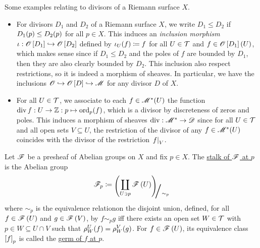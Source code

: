 \documentclass[../Moduli_Spaces_of_Riemann_Surfaces.tex]{subfiles}
\begin{document}
    \begin{example}
        Some examples relating to divisors of a Riemann surface $X$.
        \begin{itemize}
            \item For divisors $D_1$ and $D_2$ of a Riemann surface $X$, we write $D_1\leq D_2$ if $D_1\!\left(p\right)\leq D_2\!\left(p\right)$ for all $p\in X$. This induces an \textit{inclusion morphism} $\iota:\mathscr{O}\left[D_1\right]\hookrightarrow\mathscr{O}\left[D_2\right]$ defined by $\iota_U\!\left(f\right)\coloneqq f$ for all $U\in\mathcal{T}$ and $f\in\mathscr{O}\left[D_1\right]\left(U\right)$, which makes sense since if $D_1\leq D_2$ and the poles of $f$ are bounded by $D_1$, then they are also clearly bounded by $D_2$. This inclusion also respect restrictions, so it is indeed a morphism of sheaves. In particular, we have the inclusions $\mathscr{O}\hookrightarrow\mathscr{O}\left[D\right]\hookrightarrow\mathscr{M}$ for any divisor $D$ of $X$.
            \item For all $U\in\mathcal{T}$, we associate to each $f\in\mathscr{M}^\ast\!\left(U\right)$ the function $\operatorname{div} f:U\to\mathbb{Z}:p\mapsto\operatorname{ord}_p\!\left(f\right)$, which is a divisor by discreteness of zeros and poles. This induces a morphism of sheaves $\operatorname{div}:\mathscr{M}^\ast\to\mathscr{D}$ since for all $U\in\mathcal{T}$ and all open sets $V\subseteq U$, the restriction of the divisor of any $f\in\mathscr{M}^\ast\!\left(U\right)$ coincides with the divisor of the restriction $\left.f\right|_V$.\exqed
        \end{itemize}
    \end{example}
    \begin{definition}\label{CC:def:stalk}
        Let $\mathscr{F}$ be a presheaf of Abelian groups on $X$ and fix $p\in X$. The \ul{stalk of $\mathscr{F}$ at $p$} is the Abelian group
        \begin{equation*}
            \ms{F}_p\coloneqq\raisebox{-2pt}{$\Biggl(\!$}\coprod_{U\ni p}\ms{F}\l(U\r)\!\raisebox{-2pt}{$\Biggr)$}\!\!_{\scalebox{2}{/}\sim_p}
        \end{equation*}
        where $\sim_p$ is the equivalence relation\footnotemark on the disjoint union, defined, for all $f\in\mathscr{F}\left(U\right)$ and $g\in\mathscr{F}\left(V\right)$, by $f\sim_p g$ iff there exists an open set $W\in\mathcal{T}$ with $p\in W\subseteq U\cap V$ such that $\rho^U_W\!\left(f\right)=\rho^V_W\!\left(g\right)$. For $f\in\mathscr{F}\left(U\right)$, its equivalence class $\left[f\right]_p$ is called the \ul{germ of $f$ at $p$}.
    \end{definition}
\end{document}
